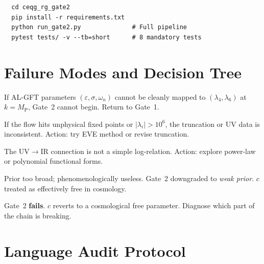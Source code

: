 \documentclass[11pt,a4paper]{article}
\theoremstyle{definition}
\theoremstyle{plain}
\theoremstyle{remark}
\newcommand{\MP}{M_{\mathrm{P}}}
\begin{document}
\begin{verbatim}
  cd ceqg_rg_gate2
  pip install -r requirements.txt
  python run_gate2.py              # Full pipeline
  pytest tests/ -v --tb=short      # 8 mandatory tests
\end{verbatim}


\section{Failure Modes and Decision Tree}
\label{sec:failures}

\begin{failmode}[title=FM-1: AL-GFT $\to$ GFT Coupling Map Ill-Defined]
If AL-GFT parameters $(\varepsilon,\sigma,\omega_n)$ cannot be cleanly
mapped to $(\lambda_4,\lambda_6)$ at $k=\MP$, Gate~2 cannot begin.
Return to Gate~1.
\end{failmode}

\begin{failmode}[title=FM-2: FRG Flow Diverges]
If the flow hits unphysical fixed points or $|\lambda_i|>10^6$, the
truncation or UV data is inconsistent.  Action: try EVE method or
revise truncation.
\end{failmode}

\begin{failmode}[title=FM-3: Log-Link Residuals $>10\%$]
The UV$\to$IR connection is not a simple log-relation.  Action: explore
power-law or polynomial functional forms.
\end{failmode}

\begin{failmode}[title=FM-4: $\sigma_c/\bar{c}>0.50$]
Prior too broad; phenomenologically useless.  Gate~2 downgraded to
\emph{weak prior}.  $c$ treated as effectively free in cosmology.
\end{failmode}

\begin{failmode}[title=FM-5: $\sigma_c/\bar{c}>1.0$]
Gate~2 \textbf{fails}.  $c$ reverts to a cosmological free parameter.
Diagnose which part of the chain is breaking.
\end{failmode}


\section{Language Audit Protocol}
\label{sec:language}
\end{document}
